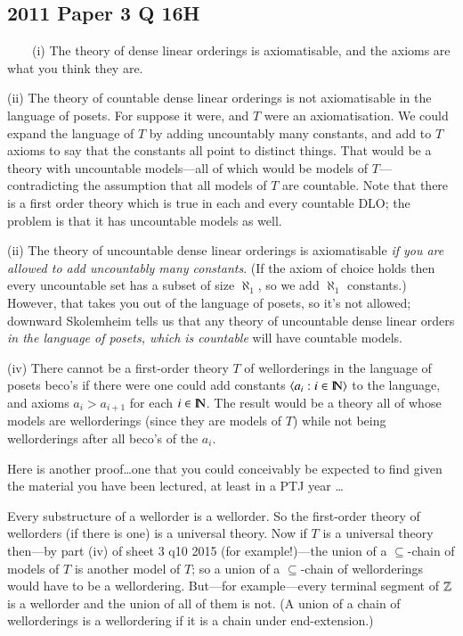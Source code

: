 \documentclass{book}
\begin{document}
\subsection*{2011 Paper 3 Q 16H}
\ \ \ \ (i)  The theory of dense linear orderings is axiomatisable, and the axioms are what you think they are.

\medskip

(ii) The theory of countable dense linear orderings is not
axiomatisable in the language of posets.  For suppose it were, and $T$
were an axiomatisation.  We could expand the language of $T$ by adding
uncountably many constants, and add to $T$ axioms to say that the
constants all point to distinct things.  That would be a theory with
uncountable models---all of which would be models of $T$---contradicting 
the assumption that all models of $T$ are countable. Note that there is 
a first order theory which is true in each and every countable DLO; the 
problem is that it has uncountable models as well.

\medskip

(ii) The theory of uncountable dense linear orderings is axiomatisable
{\sl if you are allowed to add uncountably many constants}.  (If the
axiom of choice holds then every uncountable set has a subset of size
$\aleph_1$, so we add $\aleph_1$ constants.)  However, that takes you
out of the language of posets, so it's not allowed; downward
Skolemheim tells us that any theory of uncountable dense linear orders
{\sl in the language of posets, which is countable} will have
countable models.

\medskip

(iv)  There cannot be a first-order theory $T$ of wellorderings in the
language of posets beco's if there were one could add constants
$\mbox{$\langle a_i: i \in \hbox{\rm I\negthinspace N} \rangle$}$ to the language, and axioms $a_i > a_{i+1}$
for each $i \in \hbox{\rm I\negthinspace N}$.  The result would be a theory all of whose models are
wellorderings (since they are models of $T$) while not being
wellorderings after all beco's of the $a_i$.

\smallskip 

Here is another proof\ldots one that you could conceivably be expected to find
given the material you have been lectured, at least in a PTJ year \ldots 

Every substructure of a wellorder is a wellorder.  So  the first-order theory of
wellorders (if there is one) is a universal theory. Now if $T$ is a
universal theory then---by part (iv) of sheet 3 q10 2015 (for
 example!)---the union of a $\subseteq$-chain of models of $T$
is another model of $T$; so a union of a $\subseteq$-chain of
wellorderings would have to be a wellordering.  But---for
example---every terminal segment of $\mathbb{Z}$ is a wellorder and the union
of all of them is not. (A union of a chain of wellorderings is a
wellordering if it is a chain under end-extension.)
\end{document}
